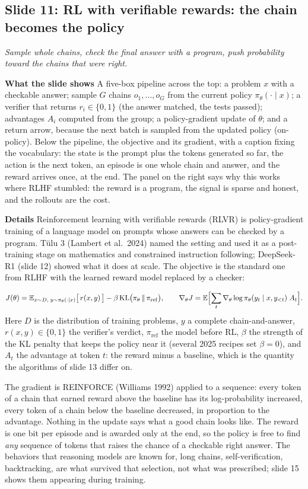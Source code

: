 \documentclass[11pt,letterpaper]{article}
\newcommand{\slide}[3]{%
  \subsection[Slide #1: #2]{Slide #1: #2}%
  {\color{muted}\itshape #3\par}\medskip}
\newcommand{\para}[1]{\medskip\noindent\textbf{#1}\quad}
\newenvironment{formulas}{\begin{tcolorbox}[formulabox]}{\end{tcolorbox}}
\newcommand{\E}{\mathbb{E}}
\begin{document}
\slide{11}{RL with verifiable rewards: the chain becomes the policy}{Sample whole chains, check the final answer with a program, push probability toward the chains that were right.}

\para{What the slide shows} A five-box pipeline across the top: a problem $x$ with a checkable answer; sample $G$ chains $o_1,\ldots,o_G$ from the current policy $\pi_\theta(\cdot\mid x)$; a verifier that returns $r_i\in\{0,1\}$ (the answer matched, the tests passed); advantages $A_i$ computed from the group; a policy-gradient update of $\theta$; and a return arrow, because the next batch is sampled from the updated policy (on-policy). Below the pipeline, the objective and its gradient, with a caption fixing the vocabulary: the state is the prompt plus the tokens generated so far, the action is the next token, an episode is one whole chain and answer, and the reward arrives once, at the end. The panel on the right says why this works where RLHF stumbled: the reward is a program, the signal is sparse and honest, and the rollouts are the cost.

\para{Details} Reinforcement learning with verifiable rewards (RLVR) is policy-gradient training of a language model on prompts whose answers can be checked by a program. Tülu 3 (Lambert et al.\ 2024) named the setting and used it as a post-training stage on mathematics and constrained instruction following; DeepSeek-R1 (slide 12) showed what it does at scale. The objective is the standard one from RLHF with the learned reward model replaced by a checker:

\begin{formulas}
\[
J(\theta)=\E_{x\sim D,\;y\sim\pi_\theta(\cdot\mid x)}\bigl[\,r(x,y)\,\bigr]-\beta\,\mathrm{KL}\bigl(\pi_\theta\,\|\,\pi_{\mathrm{ref}}\bigr),
\qquad
\nabla_\theta J=\E\Bigl[\sum_{t}\nabla_\theta\log\pi_\theta(y_t\mid x,y_{<t})\;A_t\Bigr].
\]
Here $D$ is the distribution of training problems, $y$ a complete chain-and-answer, $r(x,y)\in\{0,1\}$ the verifier's verdict, $\pi_{\mathrm{ref}}$ the model before RL, $\beta$ the strength of the KL penalty that keeps the policy near it (several 2025 recipes set $\beta=0$), and $A_t$ the advantage at token $t$: the reward minus a baseline, which is the quantity the algorithms of slide 13 differ on.
\end{formulas}

The gradient is REINFORCE (Williams 1992) applied to a sequence: every token of a chain that earned reward above the baseline has its log-probability increased, every token of a chain below the baseline decreased, in proportion to the advantage. Nothing in the update says what a good chain looks like. The reward is one bit per episode and is awarded only at the end, so the policy is free to find \emph{any} sequence of tokens that raises the chance of a checkable right answer. The behaviors that reasoning models are known for, long chains, self-verification, backtracking, are what survived that selection, not what was prescribed; slide 15 shows them appearing during training.
\end{document}
